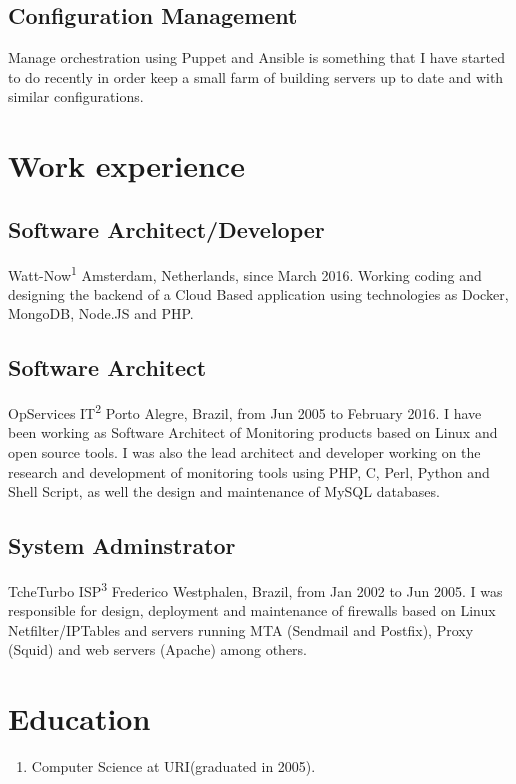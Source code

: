 \documentclass{article}
\begin{document}
\begin{multicols}{2}
\subsection{Configuration Management}
Manage orchestration using Puppet and Ansible is something that
I have started to do recently in order keep a small farm of building servers
up to date and with similar configurations.

\section{Work experience}
\subsection{Software Architect/Developer}
Watt-Now\textsuperscript{1} Amsterdam, Netherlands, since March 2016. Working coding
and designing the backend of a Cloud Based application using technologies as Docker,
MongoDB, Node.JS and PHP.

\subsection{Software Architect}
OpServices IT\textsuperscript{2} Porto Alegre, Brazil, from Jun 2005 to February 
2016. I have been working as Software Architect of Monitoring products based on Linux
and open source tools. I was also the lead architect and developer working on the 
research and development of monitoring tools using PHP, C, Perl, Python and Shell 
Script, as well the design and maintenance of MySQL databases.

\subsection{System Adminstrator}
TcheTurbo ISP\textsuperscript{3} Frederico Westphalen, Brazil, from Jan 2002 to Jun 2005.
I was responsible for design, deployment and maintenance of firewalls based on
Linux Netfilter/IPTables and servers running MTA (Sendmail and Postfix), Proxy
(Squid) and web servers (Apache) among others.

\section{Education}
\begin{enumerate}
\item Computer Science at URI(graduated in 2005).
\end{enumerate}


\end{multicols}
\end{document}
